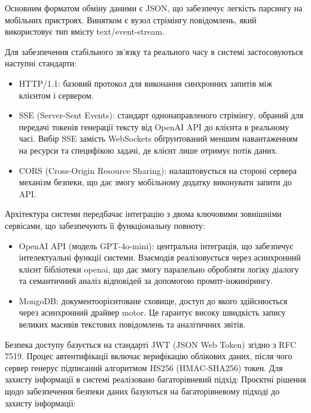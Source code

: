 Основним форматом обміну даними є JSON, що забезпечує легкість парсингу
на мобільних пристроях. Винятком є вузол стрімінгу повідомлень, який
використовує тип вмісту text/event-stream.

Для забезпечення стабільного зв'язку та реального часу в системі
застосовуються наступні стандарти:

\begin{itemize}
\item
  HTTP/1.1: базовий протокол для виконання синхронних запитів між
  клієнтом і сервером.
\item
  SSE (Server-Sent Events): стандарт однонаправленого стрімінгу, обраний
  для передачі токенів генерації тексту від OpenAI API до клієнта в
  реальному часі. Вибір SSE замість WebSockets обґрунтований меншим
  навантаженням на ресурси та специфікою задачі, де клієнт лише отримує
  потік даних.
\item
  CORS (Cross-Origin Resource Sharing): налаштовується на стороні
  сервера механізм безпеки, що дає змогу мобільному додатку виконувати
  запити до API.
\end{itemize}

Архітектура системи передбачає інтеграцію з двома ключовими зовнішніми
сервісами, що забезпечують її функціональну повноту:

\begin{itemize}
\item
  OpenAI API (модель GPT-4o-mini): центральна інтеграція, що забезпечує
  інтелектуальні функції системи. Взаємодія реалізовується через
  асинхронний клієнт бібліотеки openai, що дає змогу паралельно
  обробляти логіку діалогу та семантичний аналіз відповідей за допомогою
  промпт-інжинірингу.
\item
  MongoDB: документоорієнтоване сховище, доступ до якого здійснюється
  через асинхронний драйвер motor. Це гарантує високу швидкість запису
  великих масивів текстових повідомлень та аналітичних звітів.
\end{itemize}

Безпека доступу базується на стандарті JWT (JSON Web Token) згідно з RFC
7519. Процес автентифікації включає верифікацію облікових даних, після
чого сервер генерує підписаний алгоритмом HS256 (HMAC-SHA256) токен. Для
захисту інформації в системі реалізовано багаторівневий підхід: Проєктні
рішення щодо забезпечення безпеки даних базуються на багаторівневому
підході до захисту інформації:

